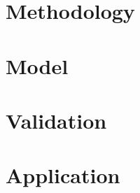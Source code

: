 \documentclass[12pt]{article}
\begin{document}
\section{Methodology}\label{Methods}


\section{Model}


\section{Validation}\label{Validation}


\section{Application}\label{Application}


\singlespacing


\appendix
\end{document}

